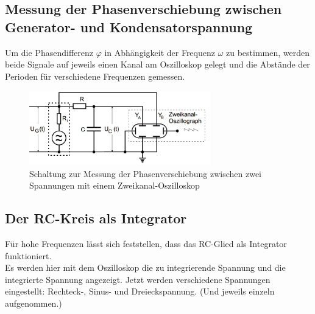 \subsection{Messung der Phasenverschiebung zwischen Generator- und Kondensatorspannung}

Um die Phasendifferenz $\varphi$ in Abhängigkeit der Frequenz $\omega$
zu bestimmen, werden beide Signale auf jeweils einen Kanal am Oszilloskop gelegt und die Abstände der Perioden für verschiedene Frequenzen gemessen.
\begin{figure}[h]
  \centering
  \includegraphics[width=0.7\textwidth]{Grafiken/V353_Abb3.jpg}
  \caption{Schaltung zur Messung der Phasenverschiebung zwischen zwei Spannungen mit einem Zweikanal-Oszilloskop}
  \label{fig:V353_Abb3}
\end{figure}
\subsection{Der RC-Kreis als Integrator}
Für hohe Frequenzen lässt sich feststellen, dass das RC-Glied als Integrator funktioniert.\\
Es werden hier mit dem Oszilloskop die zu integrierende Spannung und die integrierte Spannung angezeigt. Jetzt werden verschiedene Spannungen
eingestellt: Rechteck-, Sinus- und Dreieckspannung. (Und jeweils einzeln aufgenommen.)

